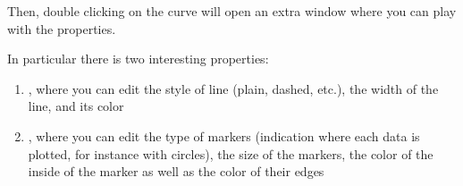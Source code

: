 Then, double clicking on the curve will open an extra window where you can play with the properties.

In particular there is two interesting properties:
\begin{enumerate}
	\item {}, where you can edit the style of line (plain, dashed, etc.), the width of the line, and its color
	\item {}, where you can edit the type of markers (indication where each data is plotted, for instance with circles), the size of the markers, the color of the inside of the marker as well as the color of their edges
\end{enumerate}








